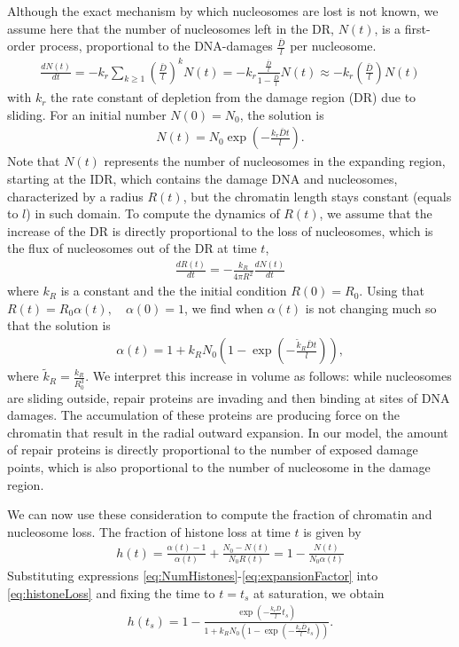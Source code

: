 \documentclass[12pt]{article}
\newcommand{\beq}{\begin{eqnarray}}
\newcommand{\eeq}{\end{eqnarray}}
\begin{document}
Although the exact mechanism by which nucleosomes are lost is not known, we assume here that the number of nucleosomes left in the DR, $N(t)$, is a first-order process, proportional to the DNA-damages $\frac{\bar{D}}{l}$ per nucleosome.
\beq
\frac{dN(t)}{dt} = -k_r\sum_{k\geq 1} (\frac{\bar{D}}{l})^kN(t)=-k_r \frac{\frac{\bar{D}}{l}}{1-\frac{\bar{D}}{l}}N(t) \approx -k_r (\frac{\bar{D}}{l})N(t)
\eeq
with $k_r$ the rate constant of depletion from the damage region (DR) due to sliding. For an initial number $N(0) = N_0$, the solution is 
\beq\label{eq:NumHistones}
N(t) = N_0\exp(-\frac{k_r\bar{D}t}{l}).
\eeq
Note that $N(t)$ represents the number of nucleosomes in the expanding region, starting at the IDR, which contains the damage DNA and nucleosomes, characterized by a radius $R(t)$, but the chromatin length stays constant (equals to $l$) in such domain. To compute the dynamics of $R(t)$, we assume that the increase of the DR is directly proportional to the loss of nucleosomes, which is the flux of nucleosomes out of the DR at time $t$,
\beq
\frac{dR(t)}{dt}=-\frac{k_R}{4\pi R^2}\frac{dN(t)}{dt}
\eeq
where $k_R $ is a constant and the the initial condition $R(0)=R_0$. Using that $R(t)=R_0 \alpha (t), \quad \alpha(0)=1$, we find when $\alpha(t)$ is not changing much so that the solution is
\beq\label{eq:expansionFactor}
\alpha(t) = 1+k_RN_0(1-\exp(-\frac{\tilde k_R\bar{D}t}{l})),
\eeq
where $\tilde k_R=\frac{k_R}{R_0^3}$. We interpret this increase in volume as follows: while nucleosomes are sliding outside, repair proteins are invading and then binding at sites of DNA damages. The accumulation of these proteins are producing force on the chromatin that result in the radial outward expansion. In our model, the amount of repair proteins is directly proportional to the number of exposed damage points, which is also proportional to the number of nucleosome in the damage region.

We can now use these consideration to compute the fraction of chromatin and nucleosome loss. The fraction of histone loss at time $t$ is given by
\beq\label{eq:histoneLoss}
h(t) = \frac{\alpha(t)-1}{\alpha(t)} +\frac{N_0-N(t)}{N_0R(t)}=1-\frac{N(t)}{N_0\alpha(t)}
\eeq
Substituting expressions \ref{eq:NumHistones}-\ref{eq:expansionFactor} into \ref{eq:histoneLoss} and fixing the time to $t=t_s$ at saturation, we obtain
\beq\label{eq:totalHistoneLoss}
h(t_s)=1-\frac{\exp(-\frac{k_r\bar{D}}{l}t_s)}{ 1+k_RN_0(1-\exp(-\frac{k_r\bar{D}}{l}t_s))}.
\eeq

\end{document}
